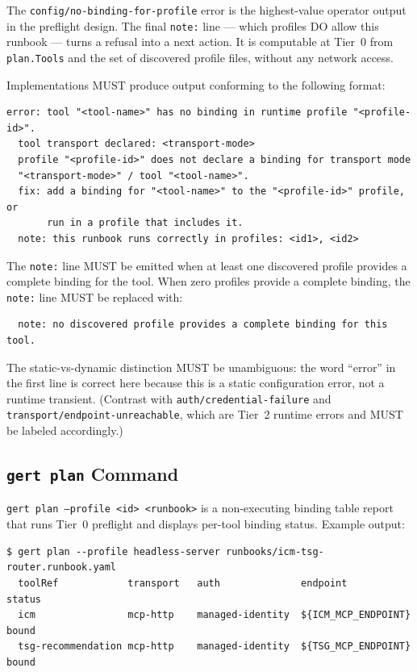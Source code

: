 The \texttt{config/no-binding-for-profile} error is the highest-value
operator output in the preflight design.  The final \texttt{note:} line —
which profiles DO allow this runbook — turns a refusal into a next action.
It is computable at Tier~0 from \texttt{plan.Tools} and the set of
discovered profile files, without any network access.

Implementations MUST produce output conforming to the following format:

\begin{verbatim}
error: tool "<tool-name>" has no binding in runtime profile "<profile-id>".
  tool transport declared: <transport-mode>
  profile "<profile-id>" does not declare a binding for transport mode
  "<transport-mode>" / tool "<tool-name>".
  fix: add a binding for "<tool-name>" to the "<profile-id>" profile, or
       run in a profile that includes it.
  note: this runbook runs correctly in profiles: <id1>, <id2>
\end{verbatim}

The \texttt{note:} line MUST be emitted when at least one discovered
profile provides a complete binding for the tool.  When zero profiles
provide a complete binding, the \texttt{note:} line MUST be replaced with:

\begin{verbatim}
  note: no discovered profile provides a complete binding for this tool.
\end{verbatim}

The static-vs-dynamic distinction MUST be unambiguous: the word ``error''
in the first line is correct here because this is a static configuration
error, not a runtime transient.  (Contrast with
\texttt{auth/credential-failure} and \texttt{transport/endpoint-unreachable},
which are Tier~2 runtime errors and MUST be labeled accordingly.)

\subsection{\texttt{gert plan} Command}
\label{subsec:rp-gert-plan}

\texttt{gert plan --profile <id> <runbook>} is a non-executing binding table
report that runs Tier~0 preflight and displays per-tool binding status.
Example output:

\begin{verbatim}
$ gert plan --profile headless-server runbooks/icm-tsg-router.runbook.yaml
  toolRef            transport   auth              endpoint               status
  icm                mcp-http    managed-identity  ${ICM_MCP_ENDPOINT}    bound
  tsg-recommendation mcp-http    managed-identity  ${TSG_MCP_ENDPOINT}    bound
\end{verbatim}

